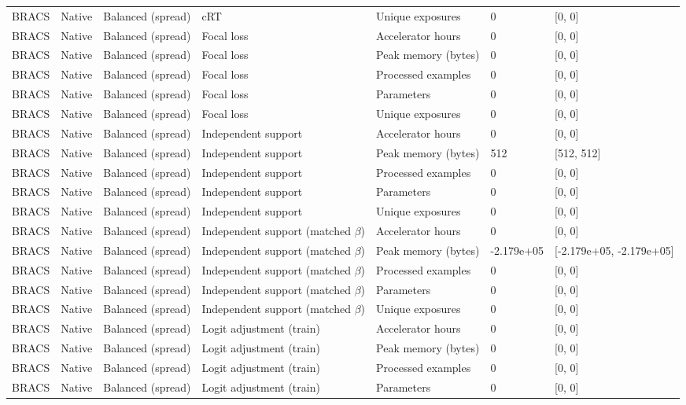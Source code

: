 \begin{longtable}{lllllll}
BRACS & Native & Balanced (spread) & cRT & Unique exposures & 0 & [0, 0] \\
BRACS & Native & Balanced (spread) & Focal loss & Accelerator hours & 0 & [0, 0] \\
BRACS & Native & Balanced (spread) & Focal loss & Peak memory (bytes) & 0 & [0, 0] \\
BRACS & Native & Balanced (spread) & Focal loss & Processed examples & 0 & [0, 0] \\
BRACS & Native & Balanced (spread) & Focal loss & Parameters & 0 & [0, 0] \\
BRACS & Native & Balanced (spread) & Focal loss & Unique exposures & 0 & [0, 0] \\
BRACS & Native & Balanced (spread) & Independent support & Accelerator hours & 0 & [0, 0] \\
BRACS & Native & Balanced (spread) & Independent support & Peak memory (bytes) & 512 & [512, 512] \\
BRACS & Native & Balanced (spread) & Independent support & Processed examples & 0 & [0, 0] \\
BRACS & Native & Balanced (spread) & Independent support & Parameters & 0 & [0, 0] \\
BRACS & Native & Balanced (spread) & Independent support & Unique exposures & 0 & [0, 0] \\
BRACS & Native & Balanced (spread) & Independent support (matched $\beta$) & Accelerator hours & 0 & [0, 0] \\
BRACS & Native & Balanced (spread) & Independent support (matched $\beta$) & Peak memory (bytes) & -2.179e+05 & [-2.179e+05, -2.179e+05] \\
BRACS & Native & Balanced (spread) & Independent support (matched $\beta$) & Processed examples & 0 & [0, 0] \\
BRACS & Native & Balanced (spread) & Independent support (matched $\beta$) & Parameters & 0 & [0, 0] \\
BRACS & Native & Balanced (spread) & Independent support (matched $\beta$) & Unique exposures & 0 & [0, 0] \\
BRACS & Native & Balanced (spread) & Logit adjustment (train) & Accelerator hours & 0 & [0, 0] \\
BRACS & Native & Balanced (spread) & Logit adjustment (train) & Peak memory (bytes) & 0 & [0, 0] \\
BRACS & Native & Balanced (spread) & Logit adjustment (train) & Processed examples & 0 & [0, 0] \\
BRACS & Native & Balanced (spread) & Logit adjustment (train) & Parameters & 0 & [0, 0] \\

\end{longtable}
